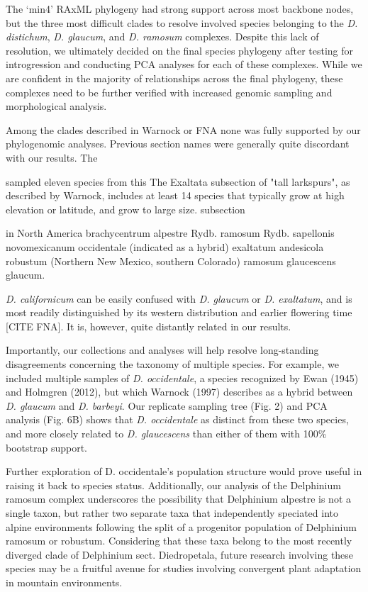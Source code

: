 \documentclass[11pt]{article}
\begin{document}
% 
The ‘min4’ RAxML phylogeny had strong support across most backbone nodes, but the 
three most difficult clades to resolve involved species belonging to the 
\emph{D. distichum}, \emph{D. glaucum}, and \emph{D. ramosum} complexes. 
Despite this lack of resolution, we ultimately decided on the final species phylogeny
after testing for introgression and conducting PCA analyses for each of these complexes.
While we are confident in the majority of relationships across the final phylogeny,
these complexes need to be further verified with increased genomic sampling and
morphological analysis.



Among the clades described in Warnock or FNA none was fully supported by our 
phylogenomic analyses. Previous section names were generally quite discordant
with our results. The 

 sampled eleven species from this
The Exaltata subsection of "tall larkspurs", as described by Warnock,
includes at least 14 species that typically grow at high elevation or 
latitude, and grow to large size. 
subsection

in North America 
brachycentrum
alpestre Rydb.
ramosum Rydb.
sapellonis
novomexicanum
occidentale (indicated as a hybrid)
exaltatum
andesicola
robustum (Northern New Mexico, southern Colorado)
ramosum
glaucescens
glaucum.


\emph{D. californicum} can be easily confused with \emph{D. glaucum} or \emph{D. exaltatum}, and
is most readily distinguished by its western distribution and earlier flowering time [CITE FNA]. 
It is, however, quite distantly related in our results.



Importantly, our collections and analyses will help resolve long-standing disagreements concerning the taxonomy of multiple species. For example, we included multiple samples of \emph{D. occidentale}, 
a species recognized by Ewan (1945) and Holmgren (2012), but which Warnock (1997) describes as
a hybrid between \emph{D. glaucum} and \emph{D. barbeyi}. 
Our replicate sampling tree (Fig. 2) and PCA analysis (Fig. 6B) shows that \emph{D. occidentale}
as distinct from these two species, and more closely related to \emph{D. glaucescens}
than either of them with 100\% bootstrap support.

Further exploration of D. occidentale’s population structure would prove useful in raising it back to species status. Additionally, our analysis of the Delphinium ramosum complex underscores the possibility that Delphinium alpestre is not a single taxon, but rather two separate taxa that independently speciated into alpine environments following the split of a progenitor population of Delphinium ramosum or robustum. Considering that these taxa belong to the most recently diverged clade of Delphinium sect. Diedropetala, future research involving these species may be a fruitful avenue for studies involving convergent plant adaptation in mountain environments.
\end{document}
